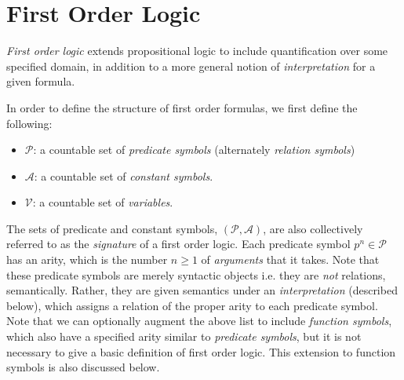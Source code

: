 \documentclass[10pt]{article}
\begin{document}
\section{First Order Logic}

\textit{First order logic} extends propositional logic to include quantification over some specified domain, in addition to a more general notion of \textit{interpretation} for a given formula.

In order to define the structure of first order formulas, we first define the following:
\begin{itemize}
    \item $\mathcal{P}$: a countable set of \textit{predicate symbols} (alternately \textit{relation symbols})
    \item  $\mathcal{A}$: a countable set of \textit{constant symbols}.
    \item $\mathcal{V}$: a countable set of \textit{variables}.
\end{itemize}
The sets of predicate and constant symbols, $(\mathcal{P}, \mathcal{A})$, are also collectively referred to as the \textit{signature} of a first order logic. Each predicate symbol $p^n \in \mathcal{P}$ has an arity, which is the number $n \geq 1$ of \textit{arguments} that it takes. Note that these predicate symbols are merely syntactic objects i.e. they are \textit{not} relations, semantically. Rather, they are given semantics under an \textit{interpretation} (described below), which assigns a relation of the proper arity to each predicate symbol. Note that we can optionally augment the above list to include \textit{function symbols}, which also have a specified arity similar to \textit{predicate symbols}, but it is not necessary to give a basic definition of first order logic. This extension to function symbols is also discussed below.
\end{document}
